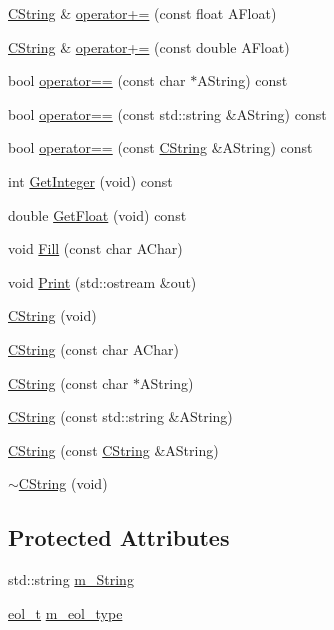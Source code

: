\begin{DoxyCompactItemize}
\hyperlink{classCString}{C\-String} \& \hyperlink{classCString_aa28cd900ff91569aca40a0fbfdfd13fd}{operator+=} (const float A\-Float)
\item 
\hyperlink{classCString}{C\-String} \& \hyperlink{classCString_a014eaeb8230f807aa39e26eea68397ec}{operator+=} (const double A\-Float)
\item 
bool \hyperlink{classCString_a3cdcd52f017c0485f2efb3463f0eaece}{operator==} (const char $\ast$A\-String) const 
\item 
bool \hyperlink{classCString_af9a96c25b951f1741c1e8f789799161f}{operator==} (const std\-::string \&A\-String) const 
\item 
bool \hyperlink{classCString_aad693875b50b03da62b7db2dc17471ef}{operator==} (const \hyperlink{classCString}{C\-String} \&A\-String) const 
\item 
int \hyperlink{classCString_a63f27f75a475dbb97fc1c735dd5f7092}{Get\-Integer} (void) const 
\item 
double \hyperlink{classCString_a3c34cb7fbba3761cd157befd18dd84bb}{Get\-Float} (void) const 
\item 
void \hyperlink{classCString_a14080d3a71c76f0ecd61a118501f5270}{Fill} (const char A\-Char)
\item 
void \hyperlink{classCString_aaf9140a07a865bd9eca80eb428f9356c}{Print} (std\-::ostream \&out)
\item 
\hyperlink{classCString_a5f71a9b3a1e95c5dc5fbdbcb8d9440ce}{C\-String} (void)
\item 
\hyperlink{classCString_a94274517246ac55176566f94a371089d}{C\-String} (const char A\-Char)
\item 
\hyperlink{classCString_a3c21822f4c9fe5b5631cb7861908c700}{C\-String} (const char $\ast$A\-String)
\item 
\hyperlink{classCString_a9f2886daa88e0c05bfbe16bd001d2944}{C\-String} (const std\-::string \&A\-String)
\item 
\hyperlink{classCString_ad678f771eea3606e8a914b6f1b394ae2}{C\-String} (const \hyperlink{classCString}{C\-String} \&A\-String)
\item 
\hyperlink{classCString_a486e3b7eb4b3a70ab3bae0177d8ff88c}{$\sim$\-C\-String} (void)
\end{DoxyCompactItemize}
\subsection*{Protected Attributes}
\begin{DoxyCompactItemize}
\item 
std\-::string \hyperlink{classCString_a182537208b2bbd077d6fdae14db4766c}{m\-\_\-\-String}
\item 
\hyperlink{classCString_aa81e0db1669e13c2a6fd7a28cf60c64f}{eol\-\_\-t} \hyperlink{classCString_a39deff9e5fb6974bd03512662b6d1fe5}{m\-\_\-eol\-\_\-type}
\end{DoxyCompactItemize}
